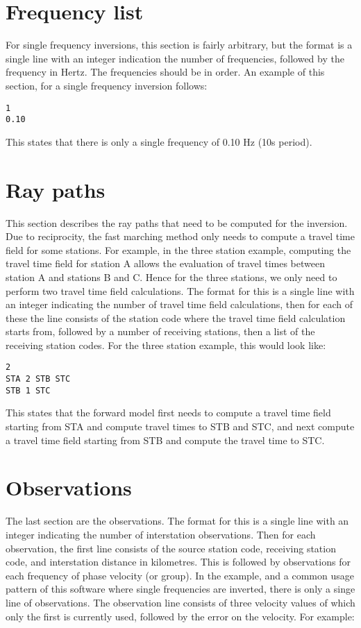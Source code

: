 \documentclass[a4paper,12pt]{article}
\begin{document}
\section{Frequency list}

For single frequency inversions, this section is fairly arbitrary, but
the format is a single line with an integer indication the number of
frequencies, followed by the frequency in Hertz. The frequencies
should be in order. An example of this section, for a single frequency
inversion follows:

\begin{verbatim}
1
0.10
\end{verbatim}

This states that there is only a single frequency of 0.10 Hz (10s period).

\section{Ray paths}

This section describes the ray paths that need to be computed for the
inversion. Due to reciprocity, the fast marching method only needs to
compute a travel time field for some stations. For example, in the
three station example, computing the travel time field for station A
allows the evaluation of travel times between station A and stations B
and C.  Hence for the three stations, we only need to perform two
travel time field calculations.  The format for this is a single line
with an integer indicating the number of travel time field
calculations, then for each of these the line consists of the station
code where the travel time field calculation starts from, followed by
a number of receiving stations, then a list of the receiving station
codes. For the three station example, this would look like:

\begin{verbatim}
2
STA 2 STB STC
STB 1 STC
\end{verbatim}

This states that the forward model first needs to compute a travel
time field starting from STA and compute travel times to STB and STC,
and next compute a travel time field starting from STB and compute the
travel time to STC.

\section{Observations}

The last section are the observations. The format for this is a single line with an
integer indicating the number of interstation observations. Then for each observation,
the first line consists of the source station code, receiving station code, and interstation
distance in kilometres. This is followed by observations for each frequency of phase velocity
(or group). In the example, and a common usage pattern of this software where single frequencies
are inverted, there is only a singe line of observations. The observation line consists of three velocity
values of which only the first is currently used, followed by the error on the velocity. For example:
\end{document}
